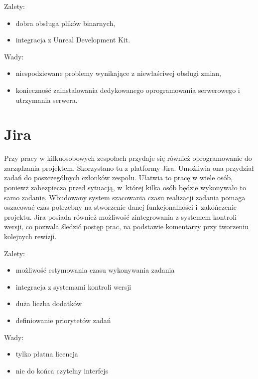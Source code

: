 \raggedright Zalety:
\begin{itemize}
\item dobra obsługa plików binarnych,
\item integracja z Unreal Development Kit.
\end{itemize}

\raggedright Wady:
\begin{itemize}
\item niespodziewane problemy wynikające z niewłaściwej obsługi zmian,
\item konieczność zainstalowania dedykowanego oprogramowania serwerowego i utrzymania serwera.
\end{itemize}

\section{Jira}

Przy pracy w kilkuosobowych zespołach przydaje się również oprogramowanie do zarządzania projektem. Skorzystano tu z platformy Jira. Umożliwia ona przydział zadań do poszczególnych członków zespołu. Ułatwia to pracę w wiele osób, poniewż zabezpiecza przed sytuacją, w~której kilka osób będzie wykonywało to samo zadanie. Wbudowany system szacowania czasu realizacji zadania pomaga oszacować czas potrzebny na stworzenie danej funkcjonalności i~zakończenie projektu. Jira posiada również możliwość zintegrowania z systemem kontroli wersji, co pozwala śledzić postęp prac, na podstawie komentarzy przy tworzeniu kolejnych rewizji.

Zalety:
\begin{itemize}
\item możliwość estymowania czasu wykonywania zadania
\item integracja z systemami kontroli wersji
\item duża liczba dodatków
\item definiowanie priorytetów zadań
\end{itemize}

Wady:
\begin{itemize}
\item tylko płatna licencja
\item nie do końca czytelny interfejs
\end{itemize}